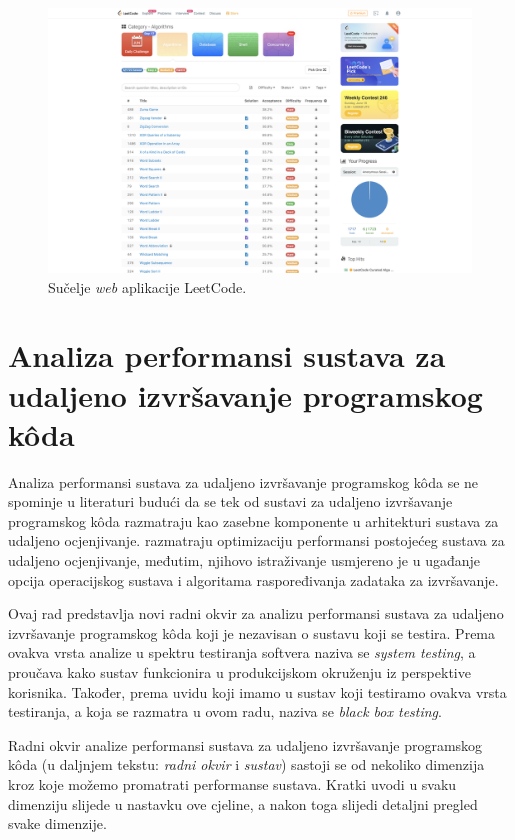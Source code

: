 \documentclass[times, utf8, diplomski]{fer}
\begin{document}
\begin{figure}[htb]
	\centering
	\includegraphics[width=\textwidth]{images/leetcode-ui.png}
	\caption{
		Sučelje \textit{web} aplikacije LeetCode.
	}
	\label{fig:leetcode-ui}
\end{figure}

\chapter{Analiza performansi sustava za udaljeno izvršavanje programskog kôda}
\label{chap:analysis}
Analiza performansi sustava za udaljeno izvršavanje programskog kôda se ne spominje u literaturi budući da se tek od \citep{9245310} sustavi za udaljeno izvršavanje programskog kôda razmatraju kao zasebne komponente u arhitekturi sustava za udaljeno ocjenjivanje.
\citep{drung2011enhance} razmatraju optimizaciju performansi postojećeg sustava za udaljeno ocjenjivanje, međutim, njihovo istraživanje usmjereno je u ugađanje opcija operacijskog sustava i algoritama raspoređivanja zadataka za izvršavanje.

Ovaj rad predstavlja novi radni okvir za analizu performansi sustava za udaljeno izvršavanje programskog kôda koji je nezavisan o sustavu koji se testira. Prema \citep{nidhra2012black} ovakva vrsta analize u spektru testiranja softvera naziva se \textit{system testing}, a proučava kako sustav funkcionira u produkcijskom okruženju iz perspektive korisnika. Također, prema uvidu koji imamo u sustav koji testiramo ovakva vrsta testiranja, a koja se razmatra u ovom radu, naziva se \textit{black box testing}.

Radni okvir analize performansi sustava za udaljeno izvršavanje programskog kôda (u daljnjem tekstu: \textit{radni okvir} i \textit{sustav}) sastoji se od nekoliko dimenzija kroz koje možemo promatrati performanse sustava. Kratki uvodi u svaku dimenziju slijede u nastavku ove cjeline, a nakon toga slijedi detaljni pregled svake dimenzije.
\end{document}
